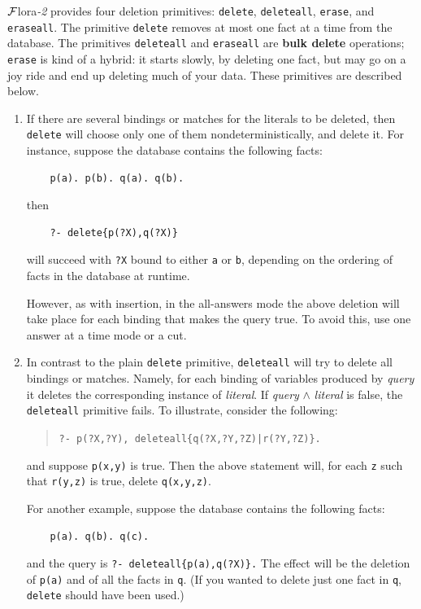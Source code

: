 \documentclass[11pt]{article}
\newcommand{\FLORA}{{\mbox{\sc ${\cal F}${lora}\rm\emph{-2}}}\xspace}
\begin{document}
\FLORA provides four deletion primitives: {\tt delete}, {\tt deleteall},
{\tt erase}, and {\tt eraseall}. The primitive {\tt delete} removes at most
one fact at a time from the database. The primitives {\tt deleteall} and
{\tt eraseall} are {\bf bulk delete} operations; {\tt erase} is kind of a
hybrid: it starts slowly, by deleting one fact, but may go on a joy ride
and end up deleting much of your data. These primitives are described
below.
\begin{enumerate}
\item If there are several bindings or matches for the literals to be
  deleted, then {\tt delete} will choose only one of them
  nondeterministically, and delete it.  For instance, suppose the database
  contains the following facts:
  \begin{verbatim}
    p(a). p(b). q(a). q(b).
  \end{verbatim}
  then
  \begin{verbatim}
    ?- delete{p(?X),q(?X)}
  \end{verbatim}
  will succeed with {\tt ?X} bound to either {\tt a} or {\tt b},
  depending on the ordering of facts in the database at runtime.

  However, as with insertion, in the all-answers mode the above deletion
  will take place for each binding that makes the query true. To avoid
  this, use one answer at a time mode or a cut.
      
\item In contrast to the plain {\tt delete} primitive, {\tt deleteall} will
  try to delete all bindings or matches.  Namely, for each binding of
  variables produced by \emph{query} it deletes the corresponding instance
  of \emph{literal}. If \emph{query} $\wedge$ \emph{literal} is false, the
  {\tt deleteall} primitive fails.  To illustrate, consider the following:
  \begin{quote}
    {\tt ?- p(?X,?Y), deleteall\{q(?X,?Y,?Z)|r(?Y,?Z)\}.}
  \end{quote}
  and suppose {\tt p(x,y)} is true. Then the above statement will, for
  each {\tt z} such that {\tt r(y,z)} is true,
  delete {\tt q(x,y,z)}.
  
  For another example, suppose the database contains the following facts:
  \begin{verbatim}
    p(a). q(b). q(c).
  \end{verbatim}
  and the query is {\tt ?- deleteall\{p(a),q(?X)\}.} The effect will be 
  the deletion of {\tt p(a)} and of all the facts in {\tt q}. (If you
  wanted to delete just one fact in {\tt q}, {\tt delete} should
  have been used.)
  

\end{enumerate}
\end{document}
